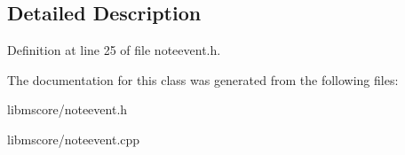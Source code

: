 \subsection{Detailed Description}


Definition at line 25 of file noteevent.\+h.



The documentation for this class was generated from the following files\+:\begin{DoxyCompactItemize}
\item 
libmscore/noteevent.\+h\item 
libmscore/noteevent.\+cpp\end{DoxyCompactItemize}
